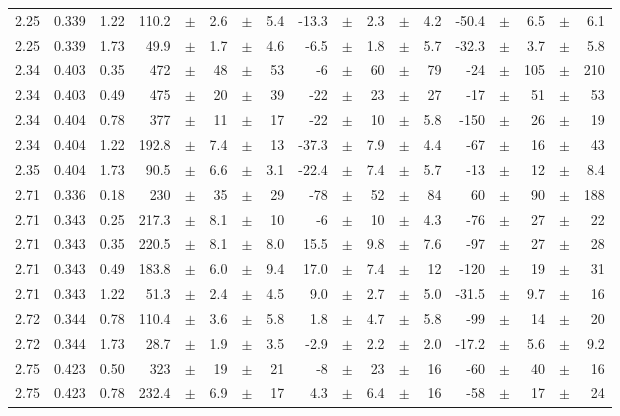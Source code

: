 \documentclass[prc,floatfix,twocolumn,superscriptaddress,letter]{revtex4}
\begin{document}
\begin{longtable}{ccc@{\extracolsep{1cm}}d@{\extracolsep{0pt}}cdcd@{\extracolsep{1cm}}d@{\extracolsep{0pt}}cdcd@{\extracolsep{1cm}}d@{\extracolsep{0pt}}cdcd}
2.25 & 0.339 & 1.22 	&	 110.2	 &  $\pm$	& 2.6 &	 $\pm$	& 5.4 &	 -13.3 &	$\pm$& 	 2.3 &	$\pm$& 	 4.2 & -50.4 & $\pm$ & 6.5 & 	$\pm$ & 6.1\\
2.25 & 0.339 & 1.73 	&	 49.9	 &  $\pm$	& 1.7 &	 $\pm$	& 4.6 &	 -6.5 &	$\pm$& 	 1.8 &	$\pm$& 	 5.7 & -32.3 & $\pm$ & 3.7 & 	$\pm$ & 5.8\\
2.34 & 0.403 & 0.35 	&	 472	 &  $\pm$	& 48 &	 $\pm$	& 53 &	 -6 &	$\pm$& 	 60 &	$\pm$& 	 79 & -24 & $\pm$ & 105 & 	$\pm$ & 210\\
2.34 & 0.403 & 0.49 	&	 475	 &  $\pm$	& 20 &	 $\pm$	& 39 &	 -22 &	$\pm$& 	 23 &	$\pm$& 	 27 & -17 & $\pm$ & 51 & 	$\pm$ & 53\\
2.34 & 0.404 & 0.78 	&	 377	 &  $\pm$	& 11 &	 $\pm$	& 17 &	 -22 &	$\pm$& 	 10 &	$\pm$& 	 5.8 & -150 & $\pm$ & 26 & 	$\pm$ & 19\\
2.34 & 0.404 & 1.22 	&	 192.8	 &  $\pm$	& 7.4 &	 $\pm$	& 13 &	 -37.3 &	$\pm$& 	 7.9 &	$\pm$& 	 4.4 & -67 & $\pm$ & 16 & 	$\pm$ & 43\\
2.35 & 0.404 & 1.73 	&	 90.5	 &  $\pm$	& 6.6 &	 $\pm$	& 3.1 &	 -22.4 &	$\pm$& 	 7.4 &	$\pm$& 	 5.7 & -13 & $\pm$ & 12 & 	$\pm$ & 8.4\\
2.71 & 0.336 & 0.18 	&	 230	 &  $\pm$	& 35 &	 $\pm$	& 29 &	 -78 &	$\pm$& 	 52 &	$\pm$& 	 84 & 60 & $\pm$ & 90 & 	$\pm$ & 188\\
2.71 & 0.343 & 0.25 	&	 217.3	 &  $\pm$	& 8.1 &	 $\pm$	& 10 &	 -6 &	$\pm$& 	 10 &	$\pm$& 	 4.3 & -76 & $\pm$ & 27 & 	$\pm$ & 22\\
2.71 & 0.343 & 0.35 	&	 220.5	 &  $\pm$	& 8.1 &	 $\pm$	& 8.0 &	 15.5 &	$\pm$& 	 9.8 &	$\pm$& 	 7.6 & -97 & $\pm$ & 27 & 	$\pm$ & 28\\
2.71 & 0.343 & 0.49 	&	 183.8	 &  $\pm$	& 6.0 &	 $\pm$	& 9.4 &	 17.0 &	$\pm$& 	 7.4 &	$\pm$& 	 12 & -120 & $\pm$ & 19 & 	$\pm$ & 31\\
2.71 & 0.343 & 1.22 	&	 51.3	 &  $\pm$	& 2.4 &	 $\pm$	& 4.5 &	 9.0 &	$\pm$& 	 2.7 &	$\pm$& 	 5.0 & -31.5 & $\pm$ & 9.7 & 	$\pm$ & 16\\
2.72 & 0.344 & 0.78 	&	 110.4	 &  $\pm$	& 3.6 &	 $\pm$	& 5.8 &	 1.8 &	$\pm$& 	 4.7 &	$\pm$& 	 5.8 & -99 & $\pm$ & 14 & 	$\pm$ & 20\\
2.72 & 0.344 & 1.73 	&	 28.7	 &  $\pm$	& 1.9 &	 $\pm$	& 3.5 &	 -2.9 &	$\pm$& 	 2.2 &	$\pm$& 	 2.0 & -17.2 & $\pm$ & 5.6 & 	$\pm$ & 9.2\\
2.75 & 0.423 & 0.50 	&	 323	 &  $\pm$	& 19 &	 $\pm$	& 21 &	 -8 &	$\pm$& 	 23 &	$\pm$& 	 16 & -60 & $\pm$ & 40 & 	$\pm$ & 16\\
2.75 & 0.423 & 0.78 	&	 232.4	 &  $\pm$	& 6.9 &	 $\pm$	& 17 &	 4.3 &	$\pm$& 	 6.4 &	$\pm$& 	 16 & -58 & $\pm$ & 17 & 	$\pm$ & 24\\

\end{longtable}
\end{document}
